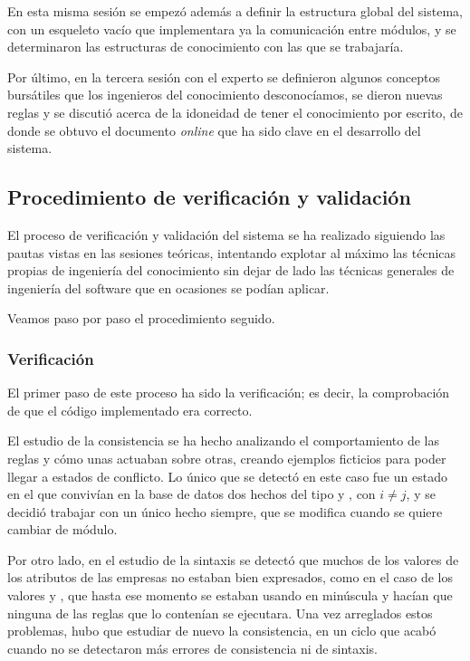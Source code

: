 \documentclass[a4paper, 11pt, titlepage]{article}
\begin{document}
    En esta misma sesión se empezó además a definir la estructura global del sistema, con un esqueleto vacío que implementara ya la comunicación entre módulos, y se determinaron las estructuras de conocimiento con las que se trabajaría.

    Por último, en la tercera sesión con el experto se definieron algunos conceptos bursátiles que los ingenieros del conocimiento desconocíamos, se dieron nuevas reglas y se discutió acerca de la idoneidad de tener el conocimiento por escrito, de donde se obtuvo el documento \emph{online} que ha sido clave en el desarrollo del sistema.

    \subsection{Procedimiento de verificación y validación}

    El proceso de verificación y validación del sistema se ha realizado siguiendo las pautas vistas en las sesiones teóricas, intentando explotar al máximo las técnicas propias de ingeniería del conocimiento sin dejar de lado las técnicas generales de ingeniería del software que en ocasiones se podían aplicar.

    Veamos paso por paso el procedimiento seguido.

    \subsubsection*{Verificación}
    El primer paso de este proceso ha sido la verificación; es decir, la comprobación de que el código implementado era correcto.

    El estudio de la consistencia se ha hecho analizando el comportamiento de las reglas y cómo unas actuaban sobre otras, creando ejemplos ficticios para poder llegar a estados de conflicto. Lo único que se detectó en este caso fue un estado en el que convivían en la base de datos dos hechos del tipo  y , con $i \neq j$, y se decidió trabajar con un único hecho siempre, que se modifica cuando se quiere cambiar de módulo.

    Por otro lado, en el estudio de la sintaxis se detectó que muchos de los valores de los atributos de las empresas no estaban bien expresados, como en el caso de los valores  y , que hasta ese momento se estaban usando en minúscula y hacían que ninguna de las reglas que lo contenían se ejecutara. Una vez arreglados estos problemas, hubo que estudiar de nuevo la consistencia, en un ciclo que acabó cuando no se detectaron más errores de consistencia ni de sintaxis.
\end{document}
